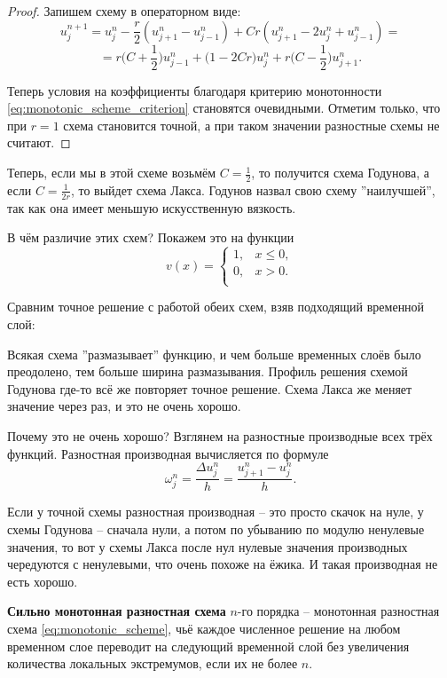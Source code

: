 \documentclass{article}
\begin{document}
\begin{proof}
	Запишем схему в операторном виде:
	\[u_j^{n+1}=u_j^n-\frac{r}{2}(u_{j+1}^n-u_{j-1}^n)+Cr(u_{j+1}^n-2u_j^n+
	u_{j-1}^n)=\]
	\[=r\Big(C+\frac{1}{2}\Big)u_{j-1}^n+\Big(1-2Cr\Big)u_j^n+r\Big(C-
	\frac{1}{2}\Big)u_{j+1}^n.\]

	Теперь условия на коэффициенты благодаря критерию монотонности
	\eqref{eq:monotonic_scheme_criterion} становятся очевидными.
	Отметим только, что при $r=1$ схема становится точной, а при таком
	значении разностные схемы не считают.
\end{proof}

Теперь, если мы в этой схеме возьмём $C=\frac{1}{2}$, то получится схема
Годунова, а если $C=\frac{1}{2r}$, то выйдет схема Лакса. Годунов назвал свою
схему ''наилучшей'', так как она имеет меньшую искусственную вязкость.

В чём различие этих схем? Покажем это на функции
\[v(x)=
	\begin{cases}
		1, & x\le 0, \\
		0, & x>0. \\
	\end{cases}
\]

Сравним точное решение с работой обеих схем, взяв подходящий временной слой:



Всякая схема ''размазывает'' функцию, и чем больше временных слоёв было
преодолено, тем больше ширина размазывания. Профиль решения схемой Годунова
где-то всё же повторяет точное решение. Схема Лакса же меняет значение через
раз, и это не очень хорошо.

Почему это не очень хорошо? Взглянем на разностные производные всех трёх
функций. Разностная производная вычисляется по формуле
\[\omega_j^n=\frac{\Delta u_j^n}{h}=\frac{u_{j+1}^n-u_j^n}{h}.\]

Если у точной схемы разностная производная -- это просто скачок на нуле, у
схемы Годунова -- сначала нули, а потом по убыванию по модулю ненулевые
значения, то вот у схемы Лакса после нул нулевые значения производных
чередуются с ненулевыми, что очень похоже на ёжика. И такая производная не есть
хорошо.

\begin{define}\label{eq:strongly_monotonic_scheme}
	\textbf{Сильно монотонная разностная схема} $n$-го порядка -- монотонная
	разностная схема \eqref{eq:monotonic_scheme}, чьё каждое численное
	решение на любом временном слое переводит на следующий временной слой
	без увеличения количества локальных экстремумов, если их не более $n$.
\end{define}
\end{document}
